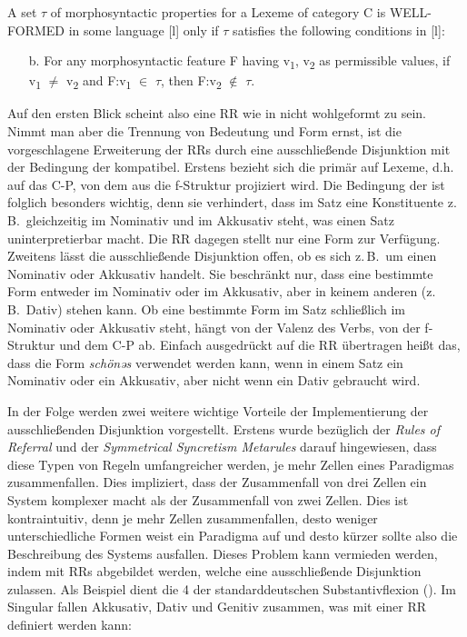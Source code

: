 \begin{exe}
\begin{exe}
\begin{exe}%
A set $\tau $ of morphosyntactic properties for a Lexeme of category C is WELL-FORMED in some language [l] only if $\tau $ satisfies the following conditions in [l]:\\
\begin{itemize}
\item[b.] For any morphosyntactic feature F having v\textsubscript{1}, v\textsubscript{2} as permissible values, if v\textsubscript{1} ${\neq}$ v\textsubscript{2} and   F:v\textsubscript{1} ${\in}$ $\tau $, then F:v\textsubscript{2} ${\notin}$ $\tau $. \citep[41]{Stump2001}
\end{itemize}\end{exe}

Auf den ersten Blick scheint also eine RR wie in  nicht wohlgeformt zu sein. Nimmt man aber die Trennung von Bedeutung und Form ernst, ist die vorgeschlagene Erweiterung der RRs durch eine ausschließende Disjunktion mit der Bedingung der  kompatibel. Erstens bezieht sich die  primär auf Lexeme, d.h. auf das C-P, von dem aus die f-Struk\-tur projiziert wird. Die Bedingung der  ist folglich besonders wichtig, denn sie verhindert, dass im Satz eine Konstituente z.\,B.\ gleichzeitig im Nominativ und im Akkusativ steht, was einen Satz uninterpretierbar macht. Die RR dagegen stellt nur eine Form zur Verfügung. Zweitens lässt die ausschließende Disjunktion offen, ob es sich z.\,B.\ um einen Nominativ oder Akkusativ handelt. Sie beschränkt nur, dass eine bestimmte Form entweder im Nominativ oder im Akkusativ, aber in keinem anderen  (z.\,B.\ Dativ) stehen kann. Ob eine bestimmte Form im Satz schließlich im Nominativ oder Akkusativ steht, hängt von der Valenz des Verbs, von der f-Struk\-tur und dem C-P ab. Einfach ausgedrückt auf die RR  übertragen heißt das, dass die Form \textit{schönəs} verwendet werden kann, wenn in einem Satz ein Nominativ oder ein Akkusativ, aber nicht wenn ein Dativ gebraucht wird.

In der Folge werden zwei weitere wichtige Vorteile der Implementierung der ausschließenden Disjunktion vorgestellt. Erstens wurde bezüglich der \textit{Rules of Referral} und der \textit{Symmetrical Syncretism Metarules} darauf hingewiesen, dass diese Typen von Regeln umfangreicher werden, je mehr Zellen eines Paradigmas zusammenfallen. Dies impliziert, dass der Zusammenfall von drei Zellen ein System komplexer macht als der Zusammenfall von zwei Zellen. Dies ist kontraintuitiv, denn je mehr Zellen zusammenfallen, desto weniger unterschiedliche Formen weist ein Paradigma auf und desto kürzer sollte also die Beschreibung des Systems ausfallen. Dieses Problem kann vermieden werden, indem  mit RRs abgebildet werden, welche eine ausschließende Disjunktion zulassen. Als Beispiel dient die  4 der standarddeutschen Substantivflexion (). Im Singular fallen Akkusativ, Dativ und Genitiv zusammen, was mit einer RR definiert werden kann:


\end{exe}
\end{exe}
